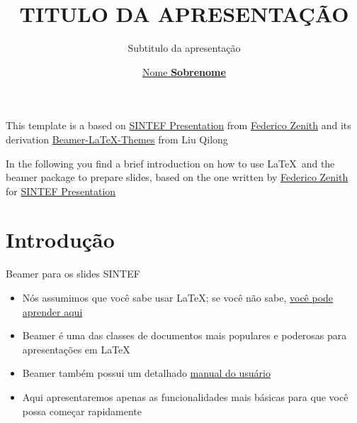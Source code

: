 \documentclass{beamer}
\title{TITULO DA APRESENTAÇÃO}
\subtitle{Subtitulo da apresentação}
\author{\href{mailto:<user-mail@ifsp.edu.br>}{Nome \textbf{Sobrenome}}}
\newcommand{\hrefcol}[2]{\textcolor{cyan}{\href{#1}{#2}}}
\begin{document}
\maketitle

\begin{frame}

      This template is a based on \hrefcol{https://www.overleaf.com/latex/templates/sintef-presentation/jhbhdffczpnx}{SINTEF Presentation} from \hrefcol{mailto:federico.zenith@sintef.no}{Federico Zenith} and its derivation \hrefcol{https://github.com/TOB-KNPOB/Beamer-LaTeX-Themes}{Beamer-LaTeX-Themes} from Liu Qilong

      \vspace{\baselineskip}

      In the following you find a brief introduction on how to use \LaTeX\ and the beamer package to prepare slides, based on the one written by \hrefcol{mailto:federico.zenith@sintef.no}{Federico Zenith} for \hrefcol{https://www.overleaf.com/latex/templates/sintef-presentation/jhbhdffczpnx}{SINTEF Presentation}


\end{frame}

\section{Introdução}

\begin{frame}{Beamer para os slides SINTEF}
      \begin{itemize}
            \item Nós assumimos que você sabe usar \LaTeX; se você não sabe,
                  \hrefcol{http://en.wikibooks.org/wiki/LaTeX/}{você pode aprender aqui}
            \item Beamer é uma das classes de documentos mais populares e poderosas para apresentações em \LaTeX
            \item Beamer também possui um detalhado
                  \hrefcol{http://www.ctan.org/tex-archive/macros/latex/contrib/beamer/doc/beameruserguide.pdf}{manual do usuário}
            \item Aqui apresentaremos apenas as funcionalidades mais básicas para que você possa começar rapidamente
      \end{itemize}
\end{frame}
\end{document}
